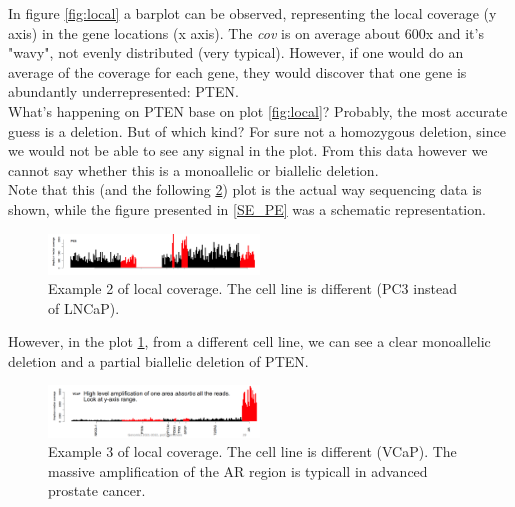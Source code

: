 In figure \ref{fig:local} a barplot can be observed, representing the local coverage (y axis) in the gene locations (x axis). The \textit{cov} is on average about 600x and it's "wavy", not evenly distributed (very typical). However, if one would do an average of the coverage for each gene, they would discover that one gene is abundantly underrepresented: PTEN.\\
What's happening on PTEN base on plot \ref{fig:local}? Probably, the most accurate guess is a deletion. But of which kind? For sure not a homozygous deletion, since we would not be able to see any signal in the plot. From this data however we cannot say whether this is a monoallelic or biallelic deletion. \\
Note that this (and the following \ref{fig:local2}) plot is the actual way sequencing data is shown, while the figure presented in \ref{SE_PE} was a schematic representation.

\begin{figure}[H]
    \centering
    \includegraphics[width=0.5\textwidth]{local_coverage1.png}
    \caption{Example 2 of local coverage. The  cell line is different (PC3 instead of LNCaP). }
    \label{fig:local1}
\end{figure}

However, in the plot \ref{fig:local1}, from a different cell line, we can see a clear monoallelic deletion and a partial biallelic deletion of PTEN.\\

\begin{figure}[H]
    \centering
    \includegraphics[width=0.5\textwidth]{local_coverage2.png}
    \caption{Example 3 of local coverage. The  cell line is different (VCaP). The massive amplification of the AR region is typicall in advanced prostate cancer.}
    \label{fig:local2}
\end{figure}

